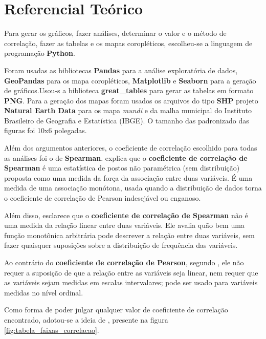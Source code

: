 \chapter{Referencial Teórico}

Para gerar os gráficos, fazer análises, determinar o valor e o método de correlação, fazer as tabelas e os mapas coropléticos, escolheu-se a linguagem de programação \textbf{Python}.

Foram usadas as bibliotecas \textbf{Pandas} para a análise exploratória de dados, \textbf{GeoPandas} para os mapa coropléticos, \textbf{Matplotlib} e \textbf{Seaborn} para a geração  de gráficos.Usou-s a biblioteca \textbf{great_tables} para gerar as tabelas em formato \textbf{PNG}. Para a geração dos mapas foram usados os arquivos do tipo \textbf{SHP} projeto \textbf{Natural Earth Data} para os mapa \textit{mundi} e da malha municipal do Instituto Brasileiro de Geografia e Estatística (IBGE). O tamanho das padronizado das figuras foi 10x6 polegadas.

Além dos argumentos anteriores, o coeficiente de correlação escolhido para todas as análises foi o de \textbf{Spearman}. \cite{hauke2011comparison} explica que o \textbf{coeficiente de correlação de Spearman} é uma estatística de postos não paramétrica (sem distribuição) proposta como uma medida da força da associação entre duas variáveis. É uma medida de uma associação monótona, usada quando a distribuição de dados torna o coeficiente de correlação de Pearson indesejável ou enganoso. 

Além disso, \cite{hauke2011comparison} esclarece que o \textbf{coeficiente de correlação de Spearman} não é uma medida da relação linear entre duas variáveis. Ele avalia quão bem uma função monotônica arbitrária pode descrever a relação entre duas variáveis, sem fazer quaisquer suposições sobre a distribuição de frequência das variáveis.

Ao contrário do \textbf{coeficiente de correlação de Pearson}, segundo \cite{hauke2011comparison}, ele não requer a suposição de que a relação entre as variáveis seja linear, nem requer que as variáveis sejam medidas em escalas intervalares; pode ser usado para variáveis medidas no nível ordinal.

Como forma de poder julgar qualquer valor de coeficiente de correlação encontrado, adotou-se a ideia de \cite{ali2022spearman}, presente na figura \ref{fig:tabela_faixas_correlacao}.

